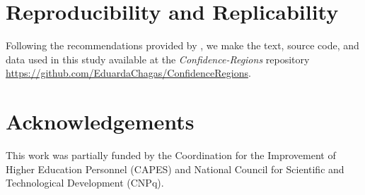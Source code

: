 \documentclass[alpha-refs]{wiley-article}
\begin{document}
\section{Reproducibility and Replicability}\label{Sec:code}

Following the recommendations provided by \cite{ABadgingSystemforReproducibilityandReplicabilityinRemoteSensingResearch}, we make the text, source code, and data used in this study available at the \textit{Confidence-Regions} repository \url{https://github.com/EduardaChagas/ConfidenceRegions}.

\section{Acknowledgements}\label{Sec:acknowledgements}
	
This work was partially funded by the Coordination for the Improvement of Higher Education Personnel (CAPES) and National Council for Scientific and Technological Development (CNPq).


\printendnotes


\end{document}
